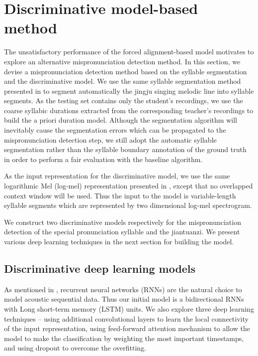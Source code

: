 \section{Discriminative model-based method}

The unsatisfactory performance of the forced alignment-based model motivates to explore an alternative mispronunciation detection method. In this section, we devise a mispronunciation detection method based on the syllable segmentation and the discriminative model. We use the same syllable segmentation method presented in  to segment automatically the jingju singing melodic line into syllable segments. As the testing set contains only the student's recordings, we use the coarse syllabic durations extracted from the corresponding teacher's recordings to build the a priori duration model. Although the segmentation algorithm will inevitably cause the segmentation errors which can be propagated to the mispronunciation detection step, we still adopt the automatic syllable segmentation rather than the syllable boundary annotation of the ground truth in order to perform a fair evaluation with the baseline algorithm.

As the input representation for the discriminative model, we use the same logarithmic Mel (log-mel) representation presented in , except that no overlapped context window will be used. Thus the input to the model is variable-length syllable segments which are represented by two dimensional log-mel spectrogram. 

We construct two discriminative models respectively for the mispronunciation detection of the special pronunciation syllable and the jiantuanzi. We present various deep learning techniques in the next section for building the model.

\subsection{Discriminative deep learning models}\label{sec:ch6:discriminative_dl_models}

As mentioned in , recurrent neural networks (RNNs) are the natural choice to model acoustic sequential data. Thus our initial model is a bidirectional RNNs with Long short-term memory (LSTM) units. We also explore three deep learning techniques -- using additional convolutional layers to learn the local connectivity of the input representation, using feed-forward attention mechanism to allow the model to make the classification by weighting the most important timestamps, and using dropout to overcome the overfitting.

